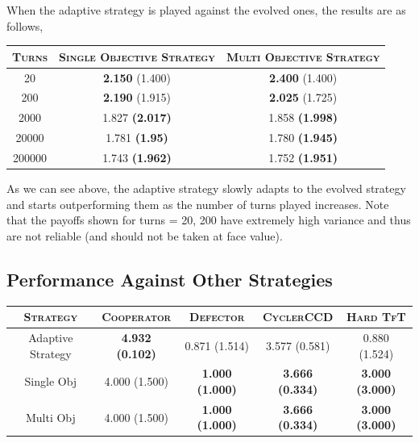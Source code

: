 \documentclass[a4paper]{article}
\begin{document}
	When the adaptive strategy is played against the evolved ones, the results are as follows,
	
	\begin{table}[H]
	  \begin{center}
	    \begin{tabular}{|c|c|c|}
	      \toprule
	 	  \textsc{Turns} & \textsc{Single Objective Strategy} & \textsc{Multi Objective Strategy}\\
	      \midrule
		  20    & \textbf{2.150} (1.400) & \textbf{2.400} (1.400)\\		  
		  200	& \textbf{2.190} (1.915) & \textbf{2.025} (1.725)\\
		  2000  & 1.827 \textbf{(2.017)} & 1.858 \textbf{(1.998)}\\
		  20000 & 1.781 \textbf{(1.95)} & 1.780 \textbf{(1.945)}\\
		  200000 & 1.743 \textbf{(1.962)} & 1.752 \textbf{(1.951)}\\
		\bottomrule
	    \end{tabular}
	  \end{center}
	\end{table}  		
	
	As we can see above, the adaptive strategy slowly adapts to the evolved strategy and starts outperforming them as the number of turns played increases. Note that the payoffs shown for turns = 20, 200 have extremely high variance and thus are not reliable (and should not be taken at face value).
	
	\subsection{Performance Against Other Strategies}
	
	\renewcommand{\tabcolsep}{8pt}

	\begin{table}[H]
	  \begin{center}
	    \begin{tabular}{|c|c|c|c|c|}
	      \toprule
	 	  \textsc{Strategy} & \textsc{Cooperator} & \textsc{Defector} & \textsc{CyclerCCD} & \textsc{Hard TfT}\\
		  \midrule
		  Adaptive Strategy & \textbf{4.932} \textbf{(0.102)} & 0.871 (1.514) & 3.577 (0.581) & 0.880 (1.524)\\
		  Single Obj & 4.000 (1.500) & \textbf{1.000 (1.000)} & \textbf{3.666 (0.334)} & \textbf{3.000 (3.000)}\\
		  Multi Obj & 4.000 (1.500) & \textbf{1.000 (1.000)} &  \textbf{3.666 (0.334)} & \textbf{3.000 (3.000)}\\
		\bottomrule
	    \end{tabular}
	  \end{center}
	\end{table}  		
\end{document}
